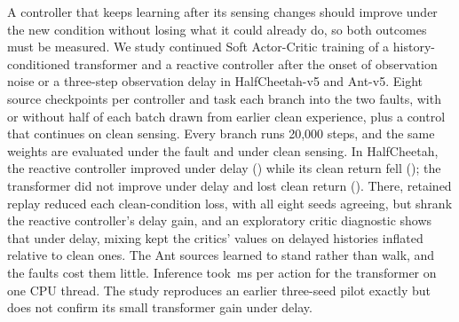 A controller that keeps learning after its sensing changes should improve under the new condition without losing what it could already do, so both outcomes must be measured. We study continued Soft Actor-Critic training of a history-conditioned transformer and a reactive controller after the onset of observation noise or a three-step observation delay in HalfCheetah-v5 and Ant-v5. Eight source checkpoints per controller and task each branch into the two faults, with or without half of each batch drawn from earlier clean experience, plus a control that continues on clean sensing. Every branch runs 20,000 steps, and the same weights are evaluated under the fault and under clean sensing. In HalfCheetah, the reactive controller improved under delay () while its clean return fell (); the transformer did not improve under delay and lost clean return (). There, retained replay reduced each clean-condition loss, with all eight seeds agreeing, but shrank the reactive controller's delay gain, and an exploratory critic diagnostic shows that under delay, mixing kept the critics' values on delayed histories inflated relative to clean ones. The Ant sources learned to stand rather than walk, and the faults cost them little. Inference took \,ms per action for the transformer on one CPU thread. The study reproduces an earlier three-seed pilot exactly but does not confirm its small transformer gain under delay.
